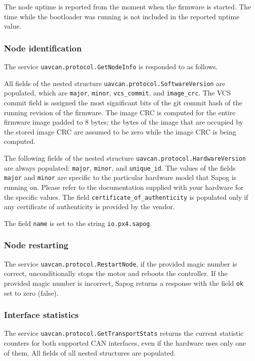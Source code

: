 \documentclass{zubaxdoc}
\begin{document}
The node uptime is reported from the moment when the firmware is started.
The time while the bootloader was running is not included in the reported uptime value.

\subsubsection{Node identification}

The service \verb|uavcan.protocol.GetNodeInfo| is responded to as follows.

All fields of the nested structure \verb|uavcan.protocol.SoftwareVersion|
are populated, which are \verb|major|, \verb|minor|, \verb|vcs_commit|, and \verb|image_crc|.
The VCS commit field is assigned the most significant bits of the git commit hash
of the running revision of the firmware.
The image CRC is computed for the entire firmware image padded to 8 bytes;
the bytes of the image that are occupied by the stored image CRC are assumed to be zero while
the image CRC is being computed.

The following fields of the nested structure \verb|uavcan.protocol.HardwareVersion|
are always populated: \verb|major|, \verb|minor|, and \verb|unique_id|.
The values of the fields \verb|major| and \verb|minor| are specific
to the particular hardware model that Sapog is running on.
Please refer to the documentation supplied with your hardware for the specific values.
The field \verb|certificate_of_authenticity| is populated only if any certificate of authenticity
is provided by the vendor.

The field \verb|name| is set to the string \verb|io.px4.sapog|.

\subsubsection{Node restarting}

The service \verb|uavcan.protocol.RestartNode|, if the provided magic number is correct,
unconditionally stops the motor and reboots the controller.
If the provided magic number is incorrect, Sapog returns a response with the field \verb|ok|
set to zero (false).

\subsubsection{Interface statistics}

The service \verb|uavcan.protocol.GetTransportStats| returns the current statistic counters
for both supported CAN interfaces, even if the hardware uses only one of them.
All fields of all nested structures are populated.
\end{document}
